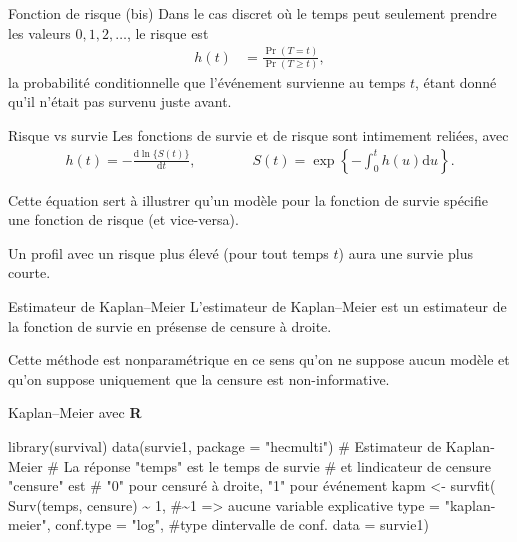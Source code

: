 \documentclass[
  ignorenonframetext,
]{beamer}
\newenvironment{Shaded}{\begin{snugshade}}{\end{snugshade}}
\newcommand{\AttributeTok}[1]{\textcolor[rgb]{0.40,0.45,0.13}{#1}}
\newcommand{\CommentTok}[1]{\textcolor[rgb]{0.37,0.37,0.37}{#1}}
\newcommand{\DecValTok}[1]{\textcolor[rgb]{0.68,0.00,0.00}{#1}}
\newcommand{\FunctionTok}[1]{\textcolor[rgb]{0.28,0.35,0.67}{#1}}
\newcommand{\NormalTok}[1]{\textcolor[rgb]{0.00,0.23,0.31}{#1}}
\newcommand{\OtherTok}[1]{\textcolor[rgb]{0.00,0.23,0.31}{#1}}
\newcommand{\SpecialCharTok}[1]{\textcolor[rgb]{0.37,0.37,0.37}{#1}}
\newcommand{\StringTok}[1]{\textcolor[rgb]{0.13,0.47,0.30}{#1}}
\begin{document}
\begin{frame}{Fonction de risque (bis)}
\protect\hypertarget{fonction-de-risque-bis}{}
Dans le cas discret où le temps peut seulement prendre les valeurs
\(0, 1, 2, \ldots\), le risque est \begin{align*}
h(t) &= \frac{\Pr(T=t)}{\Pr(T \geq t)},
\end{align*} la probabilité conditionnelle que l'événement survienne au
temps \(t\), étant donné qu'il n'était pas survenu juste avant.
\end{frame}

\begin{frame}{Risque vs survie}
\protect\hypertarget{risque-vs-survie}{}
Les fonctions de survie et de risque sont intimement reliées, avec
\begin{align*}
h(t) = - \frac{\mathrm{d} \ln\{S(t)\}}{\mathrm{d} t}, \qquad \qquad S(t) = \exp \left\{ -\int_0^t h(u) \mathrm{d} u\right\}.
\end{align*}

Cette équation sert à illustrer qu'un modèle pour la fonction de survie
spécifie une fonction de risque (et vice-versa).

Un profil avec un risque plus élevé (pour tout temps \(t\)) aura une
survie plus courte.
\end{frame}

\begin{frame}{Estimateur de Kaplan--Meier}
\protect\hypertarget{estimateur-de-kaplanmeier}{}
L'estimateur de Kaplan--Meier est un estimateur de la fonction de survie
en présense de censure à droite.

Cette méthode est nonparamétrique en ce sens qu'on ne suppose aucun
modèle et qu'on suppose uniquement que la censure est non-informative.
\end{frame}

\begin{frame}[fragile]{Kaplan--Meier avec \textbf{R}}
\protect\hypertarget{kaplanmeier-avec-r}{}
\begin{Shaded}
\begin{Highlighting}[numbers=left,,]
\FunctionTok{library}\NormalTok{(survival)}
\FunctionTok{data}\NormalTok{(survie1, }\AttributeTok{package =} \StringTok{"hecmulti"}\NormalTok{)}
\CommentTok{\# Estimateur de Kaplan{-}Meier}
\CommentTok{\# La réponse "temps" est le temps de survie }
\CommentTok{\# et l\textquotesingle{}indicateur de censure "censure" est}
\CommentTok{\# "0" pour censuré à droite, "1" pour événement}
\NormalTok{kapm }\OtherTok{\textless{}{-}} \FunctionTok{survfit}\NormalTok{(}
  \FunctionTok{Surv}\NormalTok{(temps, censure) }\SpecialCharTok{\textasciitilde{}} \DecValTok{1}\NormalTok{, }
  \CommentTok{\#\textasciitilde{}1 =\textgreater{} aucune variable explicative}
  \AttributeTok{type =} \StringTok{"kaplan{-}meier"}\NormalTok{, }
  \AttributeTok{conf.type =} \StringTok{"log"}\NormalTok{, }\CommentTok{\#type d\textquotesingle{}intervalle de conf.}
  \AttributeTok{data =}\NormalTok{ survie1)}
\end{Highlighting}
\end{Shaded}
\end{frame}
\end{document}
